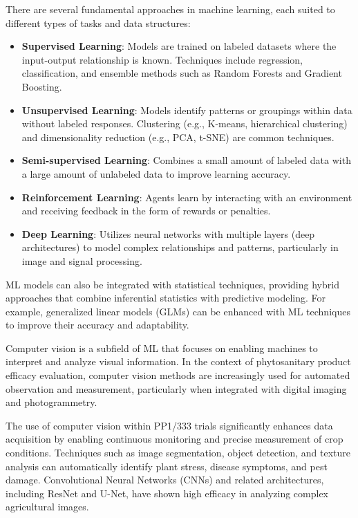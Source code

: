 \documentclass[12pt,a4paper,oneside]{report}
\begin{document}
There are several fundamental approaches in machine learning, each suited to different 
types of tasks and data structures:

\begin{itemize}
    \item \textbf{Supervised Learning}: Models are trained on labeled datasets where 
    the input-output relationship is known. Techniques include regression, classification, 
    and ensemble methods such as Random Forests and Gradient Boosting.
    \item \textbf{Unsupervised Learning}: Models identify patterns or groupings within 
    data without labeled responses. Clustering (e.g., K-means, hierarchical clustering) 
    and dimensionality reduction (e.g., PCA, t-SNE) are common techniques.
    \item \textbf{Semi-supervised Learning}: Combines a small amount of labeled data with 
    a large amount of unlabeled data to improve learning accuracy.
    \item \textbf{Reinforcement Learning}: Agents learn by interacting with an environment 
    and receiving feedback in the form of rewards or penalties.
    \item \textbf{Deep Learning}: Utilizes neural networks with multiple layers 
    (deep architectures) to model complex relationships and patterns, particularly 
    in image and signal processing.
\end{itemize}

ML models can also be integrated with statistical techniques, providing hybrid approaches that 
combine inferential statistics with predictive modeling. For example, generalized linear models 
(GLMs) can be enhanced with ML techniques to improve their accuracy and adaptability.

Computer vision is a subfield of ML that focuses on enabling machines to interpret and analyze 
visual information. In the context of phytosanitary product efficacy evaluation, computer vision 
methods are increasingly used for automated observation and measurement, particularly when 
integrated with digital imaging and photogrammetry.

The use of computer vision within PP1/333 trials significantly enhances data acquisition by 
enabling continuous monitoring and precise measurement of crop conditions. Techniques such as 
image segmentation, object detection, and texture analysis can automatically identify plant 
stress, disease symptoms, and pest damage. Convolutional Neural Networks (CNNs) and related 
architectures, including ResNet and U-Net, have shown high efficacy in analyzing complex 
agricultural images.
\end{document}
